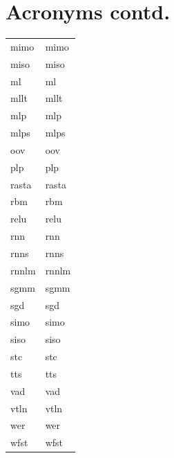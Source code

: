 \documentclass[12pt,twoside]{report}
\begin{document}
\clearpage
\begin{table}[tp]
  \label{tab:acronymns2}
\section*{Acronyms contd.}
\begin{tabular}{ll}
\acrshort{mimo} & \acrlong{mimo} \\
\acrshort{miso} & \acrlong{miso} \\
\acrshort{ml} & \acrlong{ml} \\
\acrshort{mllt} & \acrlong{mllt} \\
\acrshort{mlp} & \acrlong{mlp} \\
\acrshort{mlps} & \acrlong{mlps} \\
\acrshort{oov} & \acrlong{oov} \\
\acrshort{plp} & \acrlong{plp} \\
\acrshort{rasta} & \acrlong{rasta} \\
\acrshort{rbm} & \acrlong{rbm} \\
\acrshort{relu} & \acrlong{relu} \\
\acrshort{rnn} & \acrlong{rnn} \\
\acrshort{rnns} & \acrlong{rnns} \\
\acrshort{rnnlm} & \acrlong{rnnlm} \\
\acrshort{sgmm} & \acrlong{sgmm} \\
\acrshort{sgd} & \acrlong{sgd} \\
\acrshort{simo} & \acrlong{simo} \\
\acrshort{siso} & \acrlong{siso} \\
\acrshort{stc} & \acrlong{stc} \\
\acrshort{tts} & \acrlong{tts} \\
\acrshort{vad} & \acrlong{vad} \\
\acrshort{vtln} & \acrlong{vtln} \\
\acrshort{wer} & \acrlong{wer} \\
\acrshort{wfst} & \acrlong{wfst} 
\end{tabular}
\end{table}
\clearpage
\end{document}
